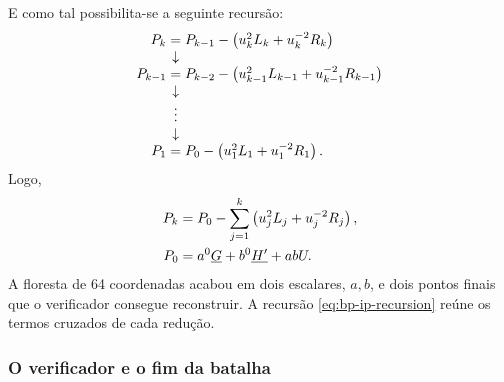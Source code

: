 E como tal possibilita-se a seguinte recursão:
\[
\begin{array}{r@{\;}c@{\;}l}
P_k&=&P_{k-1}-\left(u_k^2L_k+u_k^{-2}R_k\right)\\
&\downarrow\\
P_{k-1}&=&P_{k-2}
 -\left(u_{k-1}^2L_{k-1}+u_{k-1}^{-2}R_{k-1}\right)\\
&\downarrow\\
&\vdots\\
&\downarrow\\
P_1&=&P_0-\left(u_1^2L_1+u_1^{-2}R_1\right).
\end{array}
\]
Logo,
\begin{align}
P_k&=P_0-\sum_{j=1}^{k}\left(u_j^2L_j+u_j^{-2}R_j\right),
\label{eq:bp-p-recursion}\\
P_0&=a^{0}_{\ }\underline G
    +b^{0}_{\ }\underline{H'}
    +abU.
\label{eq:bp-p-final}
\end{align}
A floresta de 64 coordenadas acabou em dois escalares, \(a,b\), e dois pontos
finais que o verificador consegue reconstruir. A recursão
\eqref{eq:bp-ip-recursion} reúne os termos cruzados de cada redução.
\subsubsection{O verificador e o fim da batalha}
\label{sec:bullet_fim}

